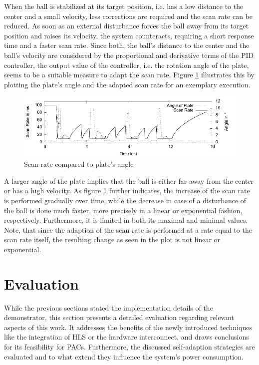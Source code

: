 When the ball is stabilized at its target position, i.e. has a low distance to
the center and a small velocity, less corrections are required and the scan
rate can be reduced. As soon as an external disturbance forces the ball away
from its target position and raises its velocity, the system counteracts,
requiring a short response time and a faster scan rate. Since both, the ball's
distance to the center and the ball's velocity are considered by the
proportional and derivative terms of the \ac{PID} controller, the output value
of the controller, i.e. the rotation angle of the plate, seems to be a
suitable measure to adapt the scan rate. Figure \ref{fig:selfadapt_a}
illustrates this by plotting the plate's angle and the adapted scan rate for an exemplary execution.
\begin{figure}
	\centering
	\includegraphics{../figures/selfadapt_a}
	\caption{Scan rate compared to plate's angle}
	\label{fig:selfadapt_a}
\end{figure}
A larger angle of the plate implies that the ball is either far away from the
center or has a high velocity. As figure \ref{fig:selfadapt_a} further
indicates, the increase of the scan rate is performed gradually over time,
while the decrease in case of a disturbance of the ball is done much faster,
more precisely in a linear or exponential fashion, respectively. Furthermore,
it is limited in both its maximal and minimal values. Note, that since the
adaption of the scan rate is performed at a rate equal to the scan rate
itself, the resulting change as seen in the plot is not linear or exponential.

\section{Evaluation}
While the previous sections stated the implementation details of the
demonstrator, this section presents a detailed evaluation regarding relevant
aspects of this work. It addresses the benefits of the newly introduced
techniques like the integration of \ac{HLS} or the hardware interconnect, and
draws conclusions for its feasibility for \acp{PAC}. Furthermore, the
discussed self-adaption strategies are evaluated and to what extend they
influence the system's power consumption.

